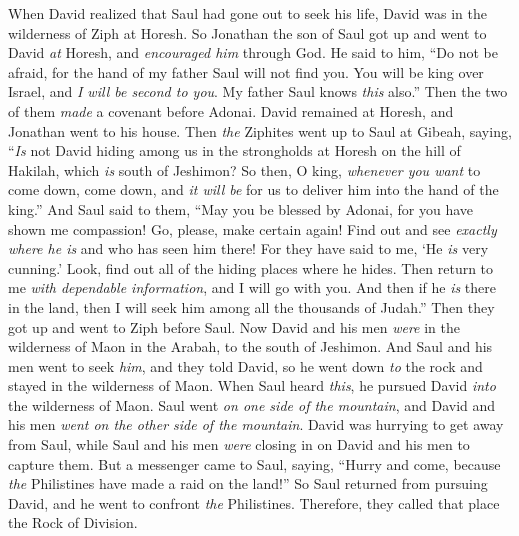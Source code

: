 \begin{biblechapter}
\verse When David realized that Saul had gone out to seek his life, David was in the wilderness of Ziph at Horesh.
\verse So Jonathan the son of Saul got up and went to David \textit{at} Horesh, and \textit{encouraged him} through God.
\verse He said to him, “Do not be afraid, for the hand of my father Saul will not find you. You will be king over Israel, and \textit{I will be second to you}. My father Saul knows \textit{this} also.”
\verse Then the two of them \textit{made} a covenant before Adonai. David remained at Horesh, and Jonathan went to his house.
\verse Then \textit{the} Ziphites went up to Saul at Gibeah, saying, “\textit{Is} not David hiding among us in the strongholds at Horesh on the hill of Hakilah, which \textit{is} south of Jeshimon?
\verse So then, O king, \textit{whenever you want} to come down, come down, and \textit{it will be} for us to deliver him into the hand of the king.”
\verse And Saul said to them, “May you be blessed by Adonai, for you have shown me compassion!
\verse Go, please, make certain again! Find out and see \textit{exactly where he is} and who has seen him there! For they have said to me, ‘He \textit{is} very cunning.’
\verse Look, find out all of the hiding places where he hides. Then return to me \textit{with dependable information}, and I will go with you. And then if he \textit{is} there in the land, then I will seek him among all the thousands of Judah.”
\verse Then they got up and went to Ziph before Saul.
\verse Now David and his men \textit{were} in the wilderness of Maon in the Arabah, to the south of Jeshimon.
\verse And Saul and his men went to seek \textit{him}, and they told David, so he went down \textit{to} the rock and stayed in the wilderness of Maon. When Saul heard \textit{this}, he pursued David \textit{into} the wilderness of Maon.
\verse Saul went \textit{on one side of the mountain}, and David and his men \textit{went on the other side of the mountain}. David was hurrying to get away from Saul, while Saul and his men \textit{were} closing in on David and his men to capture them.
\verse But a messenger came to Saul, saying, “Hurry and come, because \textit{the} Philistines have made a raid on the land!”
\verse So Saul returned from pursuing David, and he went to confront \textit{the} Philistines. Therefore, they called that place the Rock of Division.
\end{biblechapter}

